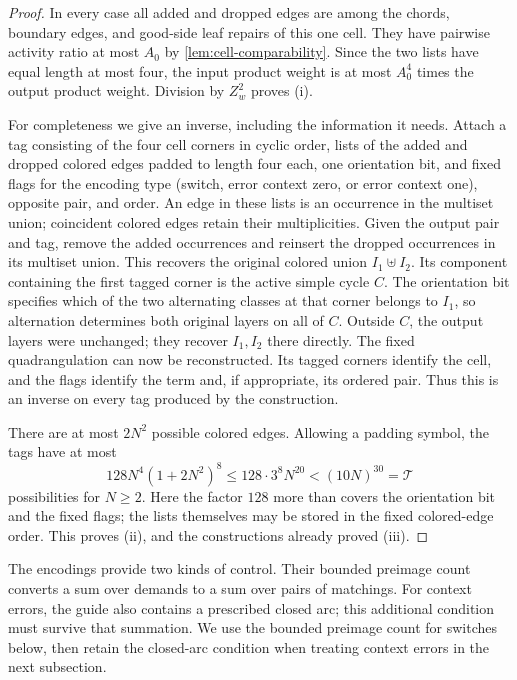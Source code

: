 \documentclass[11pt]{article}
\theoremstyle{definition}
\theoremstyle{remark}
\newcommand{\calT}{\mathcal T}
\numberwithin{equation}{section}
\begin{document}
\begin{proof}
In every case all added and dropped edges are among the chords,
boundary edges, and good-side leaf repairs of this one cell.
They have pairwise activity ratio at most $A_0$ by
\cref{lem:cell-comparability}.  Since the two lists have equal
length at most four, the input product weight is at most $A_0^4$
times the output product weight.  Division by $Z_w^2$ proves (i).

For completeness we give an inverse, including the information it
needs.  Attach a tag consisting of the four cell corners in cyclic
order, lists of the added and dropped colored edges padded to length
four each, one orientation bit, and fixed flags for the encoding type
(switch, error context zero, or error context one), opposite pair, and
order.  An edge in these lists is an occurrence in
the multiset union; coincident colored edges retain their multiplicities.
Given the output pair and tag, remove the added occurrences and
reinsert the dropped occurrences in its multiset union.  This recovers
the original colored union $I_1\uplus I_2$.  Its component containing
the first tagged corner is the active simple cycle $C$.  The
orientation bit specifies which of the two alternating classes at
that corner belongs to $I_1$, so alternation determines both original
layers on all of $C$.  Outside $C$, the output layers were unchanged;
they recover $I_1,I_2$ there directly.  The fixed quadrangulation can
now be reconstructed.  Its tagged corners identify the cell, and
the flags identify the term and, if appropriate, its ordered pair.
Thus this is an inverse on every tag produced by the construction.

There are at most $2N^2$ possible colored edges.  Allowing a padding
symbol, the tags have at most
\[
 128N^4(1+2N^2)^8
 \le128\cdot3^8N^{20}< (10N)^{30}=\calT
\]
possibilities for $N\ge2$.  Here the factor $128$ more than covers
the orientation bit and the fixed flags; the lists themselves may
be stored in the fixed colored-edge order.  This proves (ii), and
the constructions already proved (iii).
\end{proof}

The encodings provide two kinds of control. Their bounded preimage
count converts a sum over demands to a sum over pairs of matchings.
For context errors, the guide also contains a prescribed closed arc;
this additional condition must survive that summation. We use the
bounded preimage count for switches below, then retain the closed-arc
condition when treating context errors in the next subsection.
\end{document}
